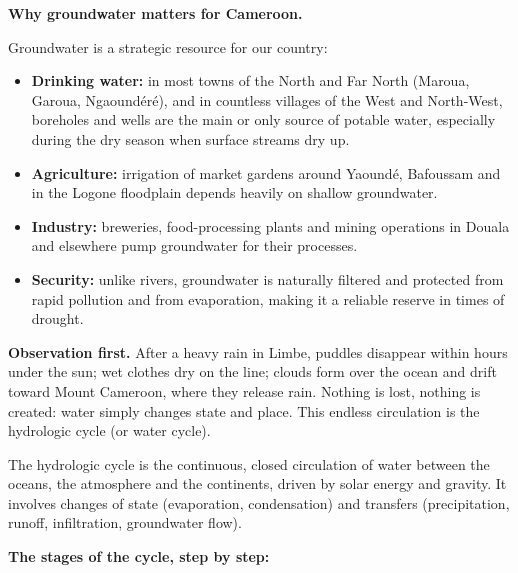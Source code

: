 \documentclass[11pt]{article}
\newcommand{\cle}[1]{{\popxbold\color{popdark}#1}}
\newcounter{popsec}
\newcounter{popsub}
\newcommand{\courssub}[1]{%
  \stepcounter{popsub}%
  \par\vspace{9pt}\noindent{\popxbold\fontsize{11.5}{13}\selectfont\color{popink}{\color{poporange}\thepopsec.\thepopsub}\hspace{6pt}#1}\par\nopagebreak\vspace{4pt}
}
\begin{document}
\textbf{Why groundwater matters for Cameroon.}\par
Groundwater is a strategic resource for our country:

\begin{itemize}
\item \textbf{Drinking water:} in most towns of the North and Far North (Maroua, Garoua, Ngaoundéré), and in countless villages of the West and North-West, boreholes and wells are the main or only source of potable water, especially during the dry season when surface streams dry up.
\item \textbf{Agriculture:} irrigation of market gardens around Yaoundé, Bafoussam and in the Logone floodplain depends heavily on shallow groundwater.
\item \textbf{Industry:} breweries, food-processing plants and mining operations in Douala and elsewhere pump groundwater for their processes.
\item \textbf{Security:} unlike rivers, groundwater is naturally filtered and protected from rapid pollution and from evaporation, making it a reliable reserve in times of drought.
\end{itemize}

\courssub{The Global Hydrologic Cycle}

\textbf{Observation first.} After a heavy rain in Limbe, puddles disappear within hours under the sun; wet clothes dry on the line; clouds form over the ocean and drift toward Mount Cameroon, where they release rain. Nothing is lost, nothing is created: water simply changes state and place. This endless circulation is the \cle{hydrologic cycle} (or water cycle).

\begin{definition}
The \cle{hydrologic cycle} is the continuous, closed circulation of water between the oceans, the atmosphere and the continents, driven by solar energy and gravity. It involves changes of state (evaporation, condensation) and transfers (precipitation, runoff, infiltration, groundwater flow).
\end{definition}

\textbf{The stages of the cycle, step by step:}
\end{document}
